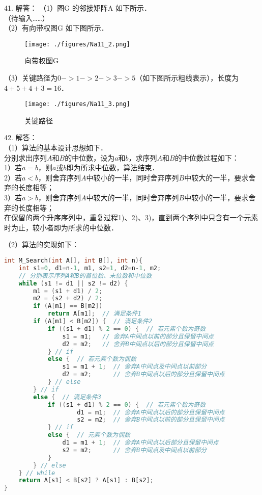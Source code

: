 41. 解答：
（1）图G 的邻接矩阵A 如下所示． \\
（待输入……） \\

（2）有向带权图G 如下图所示． \\
\begin{figure}[ht]
\centering
\texttt{[image: ./figures/Na11\_2.png]}
\caption{向带权图G} \label{Na11_fig2}
\end{figure}

（3）关键路径为$0->1->2->3->5$（如下图所示粗线表示），长度为$4+5+4+3=16$． \\
\begin{figure}[ht]
\centering
\texttt{[image: ./figures/Na11\_3.png]}
\caption{关键路径} \label{Na11_fig3}
\end{figure}

42. 解答： \\
（1）算法的基本设计思想如下． \\
分别求出序列$A$和$B$的中位数，设为$a$和$b$，求序列$A$和$B$的中位数过程如下： \\
1）若$a=b$，则$a$或$b$即为所求中位数，算法结束． \\
2）若$a<b$，则舍弃序列$A$中较小的一半，同时舍弃序列$B$中较大的一半，要求舍弃的长度相等； \\
3）若$a>b$，则舍弃序列$A$中较大的一半，同时舍弃序列$B$中较小的一半，要求舍弃的长度相等； \\
在保留的两个升序序列中，重复过程1)、2)、3)，直到两个序列中只含有一个元素时为止，较小者即为所求的中位数．

（2）算法的实现如下：
\begin{lstlisting}[language=cpp]
int M_Search(int A[], int B[], int n){
    int s1=0, d1=n-1, m1, s2=1, d2=n-1, m2;
    // 分别表示序列A和B的首位数、末位数和中位数
    while (s1 != d1 || s2 != d2) {
        m1 = (s1 + d1) / 2;
        m2 = (s2 + d2) / 2;
        if (A[m1] == B[m2])
            return A[m1];  // 满足条件1
        if (A[m1] < B[m2]) {  // 满足条件2
            if ((s1 + d1) % 2 == 0) {  // 若元素个数为奇数
                s1 = m1;   // 舍弃A中间点以前的部分且保留中间点
                d2 = m2;   // 舍弃B中间点以后的部分且保留中间点
            } // if
            else {  // 若元素个数为偶数
                s1 = m1 + 1;  // 舍弃A中间点及中间点以前部分
                d2 = m2;      // 舍弃B中间点以后的部分且保留中间点
            } // else
        } // if
        else {  // 满足条件3
            if ((s1 + d1) % 2 == 0) {  // 若元素个数为奇数
                    d1 = m1;  // 舍弃A中间点以后的部分且保留中间点
                    s2 = m2;  // 舍弃B中间点以前的部分且保留中间点
            } // if
            else {  // 元素个数为偶数
                d1 = m1 + 1;  // 舍弃A中间点以后部分且保留中间点
                s2 = m2;      // 舍弃B中间点及中间点以前部分
            }
        } // else
    } // while
    return A[s1] < B[s2] ? A[s1] : B[s2];
}
\end{lstlisting}

